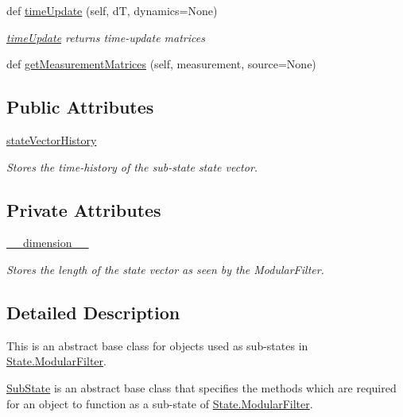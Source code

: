 \begin{DoxyCompactItemize}
def \hyperlink{classSubStates_1_1SubState_af07ac4d1435fdecff97cff84bae4eeab}{time\+Update} (self, dT, dynamics=None)
\begin{DoxyCompactList}\small\item\em \hyperlink{classSubStates_1_1SubState_af07ac4d1435fdecff97cff84bae4eeab}{time\+Update} returns time-\/update matrices \end{DoxyCompactList}\item 
def \hyperlink{classSubStates_1_1SubState_a9dcc51af847b7b946089dd73c387ca19}{get\+Measurement\+Matrices} (self, measurement, source=None)
\end{DoxyCompactItemize}
\subsection*{Public Attributes}
\begin{DoxyCompactItemize}
\item 
\hyperlink{classSubStates_1_1SubState_a24bf2de56fc3037d91cba43d28f3bf60}{state\+Vector\+History}
\begin{DoxyCompactList}\small\item\em Stores the time-\/history of the sub-\/state state vector. \end{DoxyCompactList}\end{DoxyCompactItemize}
\subsection*{Private Attributes}
\begin{DoxyCompactItemize}
\item 
\hyperlink{classSubStates_1_1SubState_aea750997b2a75daee4a3147eac68e4f8}{\+\_\+\+\_\+dimension\+\_\+\+\_\+}
\begin{DoxyCompactList}\small\item\em Stores the length of the state vector as seen by the Modular\+Filter. \end{DoxyCompactList}\end{DoxyCompactItemize}


\subsection{Detailed Description}
This is an abstract base class for objects used as sub-\/states in \hyperlink{classState_1_1ModularFilter}{State.\+Modular\+Filter}. 

\hyperlink{classSubStates_1_1SubState}{Sub\+State} is an abstract base class that specifies the methods which are required for an object to function as a sub-\/state of \hyperlink{classState_1_1ModularFilter}{State.\+Modular\+Filter}.

